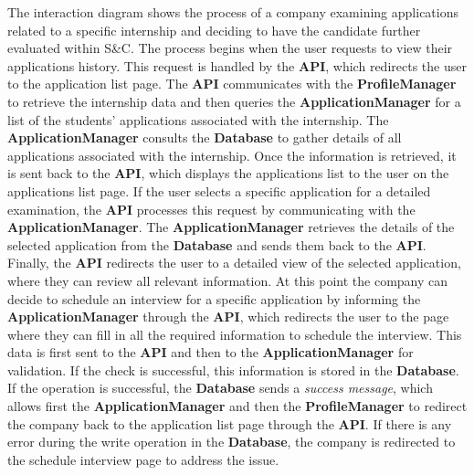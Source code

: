 \begin{enumerate}
    The interaction diagram shows the process of a company examining applications related to a specific internship and deciding to have the candidate further evaluated within S\&C. The process begins when the user requests to view their applications history. This request is handled by the \textbf{API}, which redirects the user to the application list page. The \textbf{API} communicates with the \textbf{ProfileManager} to retrieve the internship data and then queries the \textbf{ApplicationManager} for a list of the students’ applications associated with the internship.
    The \textbf{ApplicationManager} consults the \textbf{Database} to gather details of all applications associated with the internship. 
    Once the information is retrieved, it is sent back to the \textbf{API}, which displays the applications list to the user on the applications list page.
    If the user selects a specific application for a detailed examination, the \textbf{API} processes this request by communicating with the \textbf{ApplicationManager}. The \textbf{ApplicationManager} retrieves the details of the selected application from the \textbf{Database} and sends them back to the \textbf{API}. 
    Finally, the \textbf{API} redirects the user to a detailed view of the selected application, where they can review all relevant information.
    At this point the company can decide to schedule an interview for a specific application by informing the \textbf{ApplicationManager} through the \textbf{API}, which redirects the user to the page where they can fill in all the required information to schedule the interview. This data is first sent to the \textbf{API} and then to the \textbf{ApplicationManager} for validation. If the check is successful, this information is stored in the \textbf{Database}. 
    If the operation is successful, the \textbf{Database} sends a \textit{success message}, which allows first the \textbf{ApplicationManager} and then the \textbf{ProfileManager} to redirect the company back to the application list page through the \textbf{API}. 
    If there is any error during the write operation in the \textbf{Database}, the company is redirected to the schedule interview page to address the issue.


\end{enumerate}

